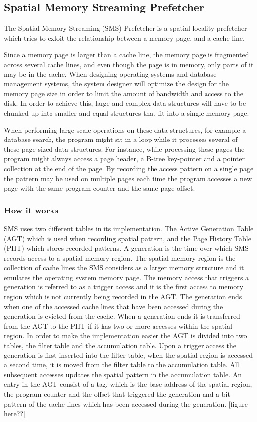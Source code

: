 \subsection{Spatial Memory Streaming Prefetcher}
\label{sec:smsPrefetcher}

The Spatial Memory Streaming (SMS) Prefetcher is a spatial locality
prefetcher which tries to exloit the relationship between a memory
page, and a cache line. 

Since a memory page is larger than a cache line, the memory page is
fragmented across several cache lines, and even though the page is in
memory, only parts of it may be in the cache.  When designing
operating systems and database management systems, the system designer
will optimize the design for the memory page size in order to limit
the amount of bandwidth and access to the disk. In order to achieve
this, large and complex data structures will have to be chunked up into
smaller and equal structures that fit into a single memory page.

When performing large scale operations on these data structures, for
example a database search, the program might sit in a loop while it
processes several of these page sized data structures. For instance,
while processing these pages the program might always access a page
header, a B-tree key-pointer and a pointer collection at the end of
the page. By recording the access pattern on a single page the pattern may
be used on multiple pages each time the program accesses a new page
with the same program counter and the same page offset.

\subsubsection{How it works}
SMS uses two different tables in its implementation. The Active
Generation Table (AGT) which is used when recording spatial pattern,
and the Page History Table (PHT) which stores recorded patterns. A
generation is the time over which SMS records access to a spatial
memory region. The spatial memory region is the collection of cache
lines the SMS considers as a larger memory structure and it emulates
the operating system memory page. The memory access that triggers a
generation is referred to as a trigger access and it is the first
access to memory region which is not currently being recorded in the
AGT. The generation ends when one of the accessed cache lines that
have been accessed during the generation is evicted from the cache.
When a generation ends it is transferred from the AGT to the PHT if it
has two or more accesses within the spatial region. In order to make
the implementation easier the AGT is divided into two tables, the
filter table and the accumulation table.  Upon a trigger access the
generation is first inserted into the filter table, when the spatial
region is accessed a second time, it is moved from the filter table to
the accumulation table. All subsequent accesses updates the spatial
pattern in the accumulation table.  An entry in the AGT consist of a
tag, which is the base address of the spatial region, the program
counter and the offset that triggered the generation and a bit pattern
of the cache lines which has been accessed during the generation.
[figure here??]

